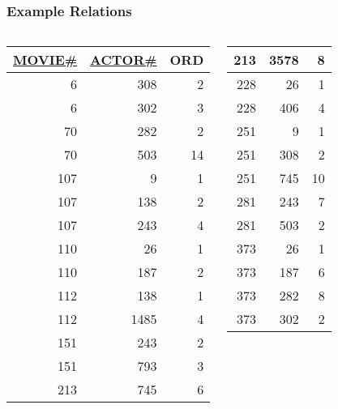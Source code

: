 \documentclass[dvipsnames]{beamer}
\theoremstyle{plain}
\begin{document}
\begin{frame}
  \frametitle{Example Relations}

  \begin{example}[CASTING]
    \begin{columns}[b]
      \begin{tiny}
      \begin{table}
        \begin{tabular}{|r|r|r|}\hline
\underline{MOVIE\#} & \underline{ACTOR\#} & ORD\\[2pt]\hline\hline
      6 &     308 &   2\\\hline
      6 &     302 &   3\\\hline
     70 &     282 &   2\\\hline
     70 &     503 &  14\\\hline
    107 &       9 &   1\\\hline
    107 &     138 &   2\\\hline
    107 &     243 &   4\\\hline
    110 &      26 &   1\\\hline
    110 &     187 &   2\\\hline
    112 &     138 &   1\\\hline
    112 &    1485 &   4\\\hline
    151 &     243 &   2\\\hline
    151 &     793 &   3\\\hline
    213 &     745 &   6\\\hline
        \end{tabular}
      \end{table}
      \end{tiny}

      \begin{tiny}
      \begin{table}
        \begin{tabular}{|r|r|r|}\hline
    213 &    3578 &   8\\\hline
    228 &      26 &   1\\\hline
    228 &     406 &   4\\\hline
    251 &       9 &   1\\\hline
    251 &     308 &   2\\\hline
    251 &     745 &  10\\\hline
    281 &     243 &   7\\\hline
    281 &     503 &   2\\\hline
    373 &      26 &   1\\\hline
    373 &     187 &   6\\\hline
    373 &     282 &   8\\\hline
    373 &     302 &   2\\\hline
        \end{tabular}
      \end{table}
      \end{tiny}


\end{columns}
\end{example}
\end{frame}
\end{document}
